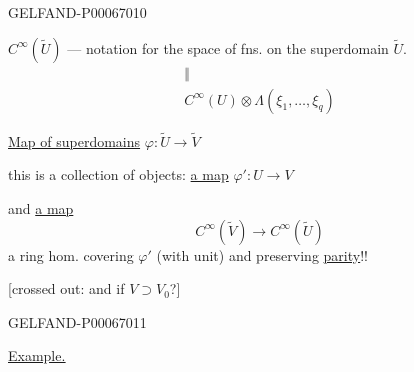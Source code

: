 \begin{GelfandAdjacentEvidence}{GELFAND-P000670}{10}


\(C^\infty(\widetilde U)\) --- notation for the space of fns. on the superdomain \(\widetilde U\).
\[
\begin{gathered}
\Vert\\
C^\infty(U)\otimes\Lambda(\xi_1,\ldots,\xi_q)
\end{gathered}
\]

\underline{Map of superdomains} \(\varphi:\widetilde U\longrightarrow\widetilde V\)

this is a collection of objects: \underline{a map} \(\varphi':U\to V\)

and \underline{a map}
\[
C^\infty(\widetilde V)\longrightarrow C^\infty(\widetilde U)
\]
a ring hom. covering \(\varphi'\) (with unit) and preserving \underline{parity}!!

[crossed out: and if \(V\supset V_0\)?]
\end{GelfandAdjacentEvidence}
\begin{GelfandAdjacentEvidence}{GELFAND-P000670}{11}


\underline{\underline{Example.}}
\end{GelfandAdjacentEvidence}
